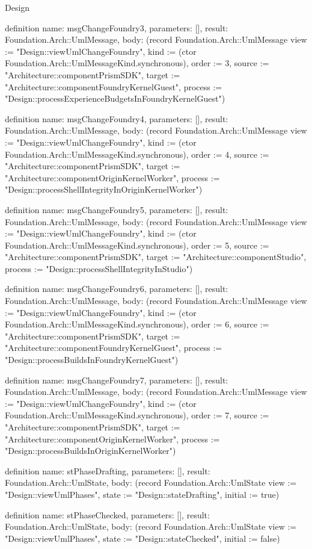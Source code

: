 \begin{lexlean}{Design}
\begin{semanticmodule}
definition{
  name: msgChangeFoundry3,
  parameters: [],
  result: Foundation.Arch::UmlMessage,
  body: (record Foundation.Arch::UmlMessage {view := "Design::viewUmlChangeFoundry", kind := (ctor Foundation.Arch::UmlMessageKind.synchronous), order := 3, source := "Architecture::componentPrismSDK", target := "Architecture::componentFoundryKernelGuest", process := "Design::processExperienceBudgetsInFoundryKernelGuest"})
}

definition{
  name: msgChangeFoundry4,
  parameters: [],
  result: Foundation.Arch::UmlMessage,
  body: (record Foundation.Arch::UmlMessage {view := "Design::viewUmlChangeFoundry", kind := (ctor Foundation.Arch::UmlMessageKind.synchronous), order := 4, source := "Architecture::componentPrismSDK", target := "Architecture::componentOriginKernelWorker", process := "Design::processShellIntegrityInOriginKernelWorker"})
}

definition{
  name: msgChangeFoundry5,
  parameters: [],
  result: Foundation.Arch::UmlMessage,
  body: (record Foundation.Arch::UmlMessage {view := "Design::viewUmlChangeFoundry", kind := (ctor Foundation.Arch::UmlMessageKind.synchronous), order := 5, source := "Architecture::componentPrismSDK", target := "Architecture::componentStudio", process := "Design::processShellIntegrityInStudio"})
}

definition{
  name: msgChangeFoundry6,
  parameters: [],
  result: Foundation.Arch::UmlMessage,
  body: (record Foundation.Arch::UmlMessage {view := "Design::viewUmlChangeFoundry", kind := (ctor Foundation.Arch::UmlMessageKind.synchronous), order := 6, source := "Architecture::componentPrismSDK", target := "Architecture::componentFoundryKernelGuest", process := "Design::processBuildsInFoundryKernelGuest"})
}

definition{
  name: msgChangeFoundry7,
  parameters: [],
  result: Foundation.Arch::UmlMessage,
  body: (record Foundation.Arch::UmlMessage {view := "Design::viewUmlChangeFoundry", kind := (ctor Foundation.Arch::UmlMessageKind.synchronous), order := 7, source := "Architecture::componentPrismSDK", target := "Architecture::componentOriginKernelWorker", process := "Design::processBuildsInOriginKernelWorker"})
}

definition{
  name: stPhaseDrafting,
  parameters: [],
  result: Foundation.Arch::UmlState,
  body: (record Foundation.Arch::UmlState {view := "Design::viewUmlPhases", state := "Design::stateDrafting", initial := true})
}

definition{
  name: stPhaseChecked,
  parameters: [],
  result: Foundation.Arch::UmlState,
  body: (record Foundation.Arch::UmlState {view := "Design::viewUmlPhases", state := "Design::stateChecked", initial := false})
}


\end{semanticmodule}
\end{lexlean}
